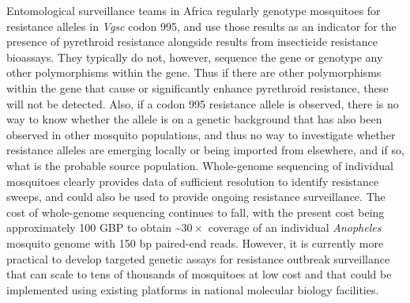 \documentclass[a4paper,11pt,abstracton,hidelinks]{scrartcl}
\begin{document}
%
Entomological surveillance teams in Africa regularly genotype mosquitoes for resistance alleles in \textit{Vgsc} codon 995, and use those results as an indicator for the presence of pyrethroid resistance alongside results from insecticide resistance bioassays.
%
They typically do not, however, sequence the gene or genotype any other polymorphisms within the gene.
%
Thus if there are other polymorphisms within the gene that cause or significantly enhance pyrethroid resistance, these will not be detected.
%
Also, if a codon 995 resistance allele is observed, there is no way to know whether the allele is on a genetic background that has also been observed in other mosquito populations, and thus no way to investigate whether resistance alleles are emerging locally or being imported from elsewhere, and if so, what is the probable source population.
%
Whole-genome sequencing of individual mosquitoes clearly provides data of sufficient resolution to identify resistance sweeps, and could also be used to provide ongoing resistance surveillance.
%
The cost of whole-genome sequencing continues to fall, with the present cost being approximately 100 GBP to obtain \textasciitilde$30\times$ coverage of an individual \emph{Anopheles} mosquito genome with 150 bp paired-end reads.
%
However, it is currently more practical to develop targeted genetic assays for resistance outbreak surveillance that can scale to tens of thousands of mosquitoes at low cost and that could be implemented using existing platforms in national molecular biology facilities.
%
\end{document}
